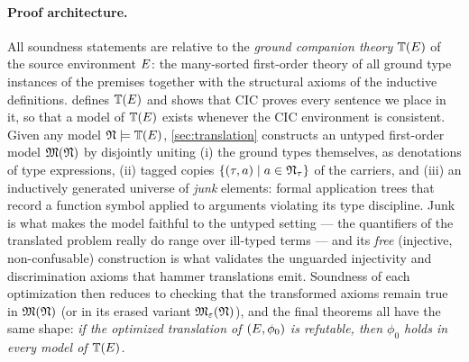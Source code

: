 \paragraph{Proof architecture.}
All soundness statements are relative to the \emph{ground companion theory}
$\mathbb{T}(E)$ of the source environment $E$: the many-sorted first-order theory of
all ground type instances of the premises together with the structural
axioms of the inductive definitions.   defines $\mathbb{T}(E)$ and
shows that CIC proves every sentence we place in it, so that a model of
$\mathbb{T}(E)$ exists whenever the CIC environment is consistent.  Given any model
$\mathfrak{N} \models \mathbb{T}(E)$, \cref{sec:translation} constructs an untyped first-order
model $\mathfrak{M}(\mathfrak{N})$ by disjointly uniting (i) the ground types themselves, as
denotations of type expressions, (ii) tagged copies
$\{(\tau,a) \mid a \in \mathfrak{N}_\tau\}$ of the carriers, and (iii) an inductively
generated universe of \emph{junk} elements: formal application trees that
record a function symbol applied to arguments violating its type discipline.
Junk is what makes the model faithful to the untyped setting --- the
quantifiers of the translated problem really do range over ill-typed terms
--- and its \emph{free} (injective, non-confusable) construction is what
validates the unguarded injectivity and discrimination axioms that hammer
translations emit.  Soundness of each optimization then reduces to checking
that the transformed axioms remain true in $\mathfrak{M}(\mathfrak{N})$ (or in its erased variant
$\mathfrak{M}_{\varepsilon}(\mathfrak{N})$), and the final theorems all have the same shape: \emph{if the
optimized translation of $(E,\phi_0)$ is refutable, then $\phi_0$ holds
in every model of $\mathbb{T}(E)$.}
